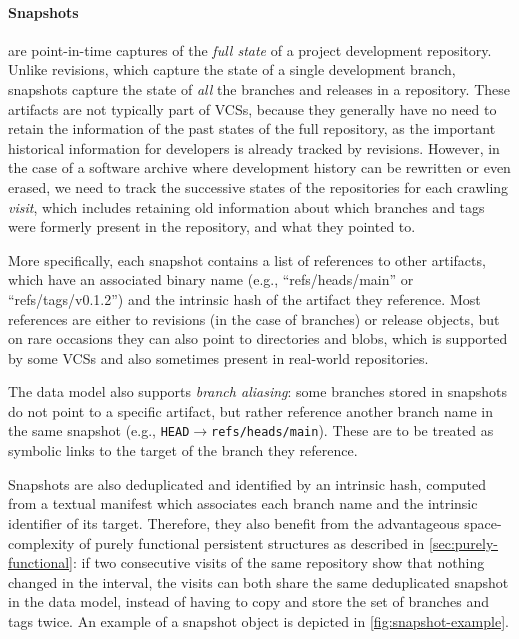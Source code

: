 \begin{figure}\centering
{}
\end{figure}
\paragraph{\textbf{Snapshots}} are point-in-time captures of the \emph{full
state} of a project development repository. Unlike revisions, which capture the
state of a single development branch, snapshots capture the state of \emph{all}
the branches and releases in a repository. These artifacts are not typically
part of \glspl{VCS}, because they generally have no need to retain the
information of the past states of the full repository, as the important
historical information for developers is already tracked by revisions. However,
in the case of a software archive where development history can be rewritten or
even erased, we need to track the successive states of the repositories for
each crawling \emph{visit}, which includes retaining old information about
which branches and tags were formerly present in the repository, and what they
pointed to.

More specifically, each snapshot contains a list of references to other
artifacts, which have an associated binary name (e.g., ``refs/heads/main'' or
``refs/tags/v0.1.2'') and the intrinsic hash of the artifact they reference.
Most references are either to revisions (in the case of branches) or release
objects, but on rare occasions they can also point to directories and
blobs, which is supported by some \glspl{VCS} and also sometimes present in
real-world repositories.

The data model also supports \emph{branch aliasing}: some branches stored in
snapshots do not point to a specific artifact, but rather reference another
branch name in the same snapshot (e.g.,
\texttt{HEAD}$\to$\texttt{refs/heads/main}). These are to be treated as
symbolic links to the target of the branch they reference.

Snapshots are also deduplicated and identified by an intrinsic hash, computed
from a textual manifest which associates each branch name and the intrinsic
identifier of its target. Therefore, they also benefit from the advantageous
space-complexity of purely functional persistent structures as described in
\cref{sec:purely-functional}: if two consecutive visits of the same repository
show that nothing changed in the interval, the visits can both share the same
deduplicated snapshot in the data model, instead of having to copy and store
the set of branches and tags twice.
An example of a snapshot object is depicted in \cref{fig:snapshot-example}.

